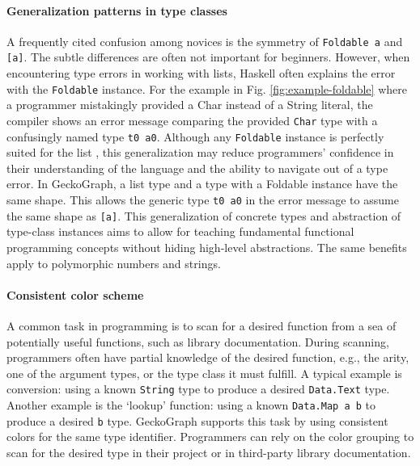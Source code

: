 \paragraph{Generalization patterns in type classes}
A frequently cited confusion among novices is the symmetry of \texttt{Foldable a} and \texttt{[a]}. The subtle differences are often not important for beginners. However, when encountering type errors in working with lists, Haskell often explains the error with the \texttt{Foldable} instance. For the example in Fig. \ref{fig:example-foldable} where a programmer mistakingly provided a Char instead of a String literal, the compiler shows an error message comparing the provided \texttt{Char} type with a confusingly named type \texttt{t0 a0}. Although any \texttt{Foldable} instance is perfectly suited for the list \cite{Waldmann2018-hu}, this generalization may reduce programmers' confidence in their understanding of the language and the ability to navigate out of a type error. In GeckoGraph, a list type and a type with a Foldable instance have the same shape. This allows the generic type \texttt{t0 a0} in the error message to assume the same shape as \texttt{[a]}. This generalization of concrete types and abstraction of type-class instances aims to allow for teaching fundamental functional programming concepts without hiding high-level abstractions. The same benefits apply to polymorphic numbers and strings.


\paragraph{Consistent color scheme}\label{par:color-scheme}
A common task in programming is to scan for a desired function from a sea of potentially useful functions, such as library documentation. During scanning, programmers often have partial knowledge of the desired function, e.g., the arity, one of the argument types, or the type class it must fulfill.  A typical example is conversion: using a known \texttt{String} type to produce a desired \texttt{Data.Text}  type. Another example is the `lookup' function: using a known \texttt{Data.Map a b} to produce a desired \texttt{b} type. GeckoGraph supports this task by using consistent colors for the same type identifier. Programmers can rely on the color grouping to scan for the desired type in their project or in third-party library documentation.

